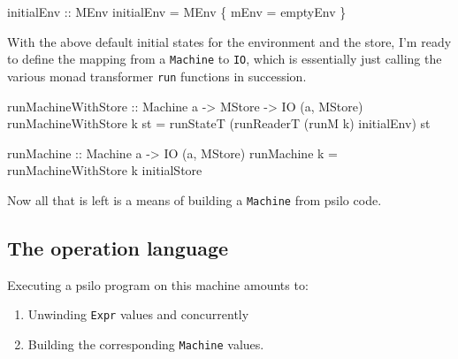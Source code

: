 \documentclass[]{article}
\newenvironment{Shaded}{}{}
\newcommand{\DataTypeTok}[1]{\textcolor[rgb]{0.56,0.13,0.00}{{#1}}}
\newcommand{\OtherTok}[1]{\textcolor[rgb]{0.00,0.44,0.13}{{#1}}}
\newcommand{\FunctionTok}[1]{\textcolor[rgb]{0.02,0.16,0.49}{{#1}}}
\newcommand{\NormalTok}[1]{{#1}}
\begin{document}
\begin{Shaded}
\begin{Highlighting}[]
\OtherTok{initialEnv ::} \DataTypeTok{MEnv}
\NormalTok{initialEnv }\FunctionTok{=} \DataTypeTok{MEnv} \NormalTok{\{ mEnv }\FunctionTok{=} \NormalTok{emptyEnv \}}
\end{Highlighting}
\end{Shaded}

With the above default initial states for the environment and the store,
I'm ready to define the mapping from a \texttt{Machine} to \texttt{IO},
which is essentially just calling the various monad transformer
\texttt{run} functions in succession.

\begin{Shaded}
\begin{Highlighting}[]
\OtherTok{runMachineWithStore ::} \DataTypeTok{Machine} \NormalTok{a }\OtherTok{->} \DataTypeTok{MStore} \OtherTok{->} \DataTypeTok{IO} \NormalTok{(a, }\DataTypeTok{MStore}\NormalTok{)}
\NormalTok{runMachineWithStore k st }\FunctionTok{=} \NormalTok{runStateT (runReaderT (runM k) initialEnv) st}
\end{Highlighting}
\end{Shaded}

\begin{Shaded}
\begin{Highlighting}[]
\OtherTok{runMachine ::} \DataTypeTok{Machine} \NormalTok{a }\OtherTok{->} \DataTypeTok{IO} \NormalTok{(a, }\DataTypeTok{MStore}\NormalTok{)}
\NormalTok{runMachine k }\FunctionTok{=} \NormalTok{runMachineWithStore k initialStore}
\end{Highlighting}
\end{Shaded}

Now all that is left is a means of building a \texttt{Machine} from
psilo code.

\subsection{The operation language}\label{the-operation-language}

Executing a psilo program on this machine amounts to:

\begin{enumerate}
\def\labelenumi{\arabic{enumi}.}
\itemsep1pt\parskip0pt
\item
  Unwinding \texttt{Expr} values and concurrently
\item
  Building the corresponding \texttt{Machine} values.
\end{enumerate}
\end{document}
